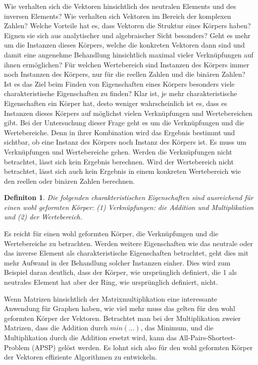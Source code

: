 \documentclass[oneside]{scrbook}
\newtheorem{definition}{Definiton}[section]
\numberwithin{equation}{section}
\begin{document}
Wie verhalten sich die Vektoren hinsichtlich des neutralen Elements und des inversen Elements? Wie verhalten sich Vektoren im Bereich der komplexen Zahlen? Welche Vorteile hat es, dass Vektoren die Struktur eines Körpers haben? Eignen sie sich aus analytischer und algebraischer Sicht besonders? Geht es mehr um die Instanzen dieses Körpers, welche die konkreten Vektoren dann sind und damit eine angenehme Behandlung hinsichtlich maximal vieler Verknüpfungen auf ihnen ermöglichen? Für welchen Wertebereich sind Instanzen des Körpers immer noch Instanzen des Körpers, nur für die reellen Zahlen und die binären Zahlen? Ist es das Ziel beim Finden von Eigenschaften eines Körpers besonders viele charakteristische Eigenschaften zu finden? Klar ist, je mehr charakteristische Eigenschaften ein Körper hat, desto weniger wahrscheinlich ist es, dass es Instanzen dieses Körpers auf möglichst vielen Verknüpfungen und Wertebereichen gibt. Bei der Untersuchung dieser Frage geht es um die Verknüpfungen und die Wertebereiche. Denn in ihrer Kombination wird das Ergebnis bestimmt und sichtbar, ob eine Instanz des Körpers noch Instanz des Körpers ist. Es muss um Verknüpfungen und Wertebereiche gehen. Werden die Verknüpfungen nicht betrachtet, lässt sich kein Ergebnis berechnen. Wird der Wertebereich nicht betrachtet, lässt sich auch kein Ergebnis in einem konkreten Wertebereich wie den reellen oder binären Zahlen berechnen.
\begin{definition}
	Die folgenden charakteristischen Eigenschaften sind ausreichend für einen wohl geformten Körper: (1) Verknüpfungen: die Addition und Multiplikation und (2) der Wertebereich.
\end{definition}
Es reicht für einen wohl geformten Körper, die Verknüpfungen und die Wertebereiche zu betrachten. Werden weitere Eigenschaften wie das neutrale oder das inverse Element als charakteristische Eigenschaften betrachtet, geht dies mit mehr Aufwand in der Behandlung solcher Instanzen einher. Dies wird zum Beispiel daran deutlich, dass der Körper, wie ursprünglich definiert, die 1 als neutrales Element hat aber der Ring, wie ursprünglich definiert, nicht.

Wenn Matrizen hinsichtlich der Matrixmultiplikation eine interessante Anwendung für Graphen haben, wie viel mehr muss das gelten für den wohl geformten Körper der Vektoren. Betrachtet man bei der Multiplikation zweier Matrizen, dass die Addition durch $min(\ldots)$, das Minimum, und die Multiplikation durch die Addition ersetzt wird, kann das All-Pairs-Shortest-Problem (APSP) gelöst werden. Es lohnt sich also für den wohl geformten Körper der Vektoren effiziente Algorithmen zu entwickeln.
\end{document}
